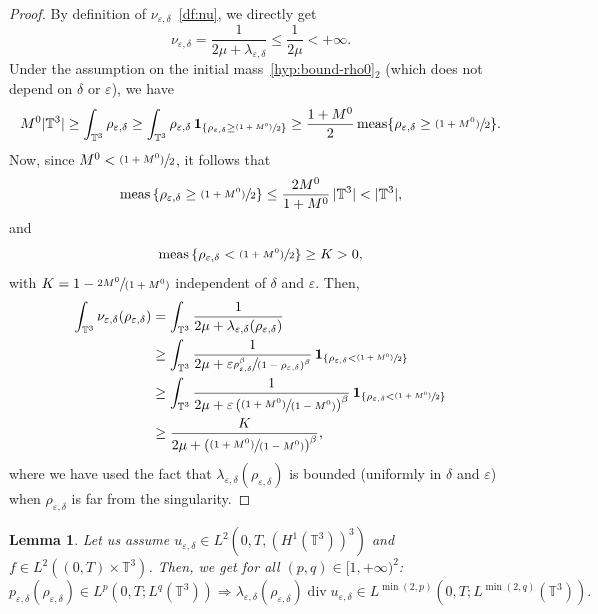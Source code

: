\documentclass[10pt]{amsart}
\newcommand{\<}{\bigl\langle}
\renewcommand{\>}{\bigr\rangle}
\newcommand{\psfrac}[2]{\sfrac{(#1)}{#2}}
\newcommand{\spfrac}[2]{\sfrac{#1}{(#2)}}
\newcommand{\pspfrac}[2]{\sfrac{(#1)}{(#2)}}
\DeclareMathOperator{\meas}{meas}
\newtheorem{lem}[thm]{Lemma}
\theoremstyle{definition}
\theoremstyle{remark}
\newcommand{\TT}{\mathbb{T}^3}
\DeclareMathOperator{\Div}{div}
\let\ep\varepsilon
\begin{document}
\begin{proof} By definition of $\nu_{\ep,\delta}$~\eqref{df:nu}, we directly get
\[
\nu_{\ep,\delta} = \dfrac{1}{2\mu + \lambda_{\ep,\delta}} \leq \dfrac{1}{2\mu} < +\infty.
\]
Under the assumption on the initial mass~\eqref{hyp:bound-rho0}${}_2$ (which does not depend on $\delta$ or $\ep$), we have
\[
M^0 |\TT|
\geq \int_{\TT}{\rho_{\ep,\delta}} \geq \int_{\TT}{\rho_{\ep,\delta} \,\mathbf{1}_{\{\rho_{\ep,\delta} \geq \psfrac{1+M^0}{2}\}} }
\geq \dfrac{1+M^0}{2} \meas\{\rho_{\ep,\delta} \geq \psfrac{1+M^0}{2}\}.
\]
Now, since $ M^0 < \psfrac{1+M^0}{2 }$, it follows that
\begin{equation*}
\meas \left\{ \rho_{\ep,\delta} \geq \psfrac{1+M^0}{2} \right\} \leq \dfrac{2M^0}{1+M^0}\,|\TT| < |\TT|,
\end{equation*}
and
\begin{equation*}
\meas \left\{ \rho_{\ep,\delta} < \psfrac{1+M^0}{2} \right\} \geq K > 0,
\end{equation*}
with $K = 1- \spfrac{2M^0}{1+M^0}$ independent of $\delta$ and $\ep$.
Then,
\begin{align*}
\int_{\TT}{\nu_{\ep,\delta}(\rho_{\ep,\delta})}
& = \int_{\TT}{\dfrac{1}{2\mu + \lambda_{\ep,\delta}(\rho_{\ep,\delta})} }\\
& \geq \int_{\TT}{\dfrac{1}{2\mu + \ep \sfrac{\rho_{\ep,\delta}^\beta}{(1-\rho_{\ep,\delta})^\beta}}\,\mathbf{1}_{\{ \rho_{\ep,\delta} < \psfrac{1+M^0}{2} \}} } \\
& \geq \int_{\TT}{\dfrac{1}{2\mu + \ep \left(\pspfrac{1+M^0}{1-M^0}\right)^\beta }\,\mathbf{1}_{\{ \rho_{\ep,\delta} < \psfrac{1+M^0}{2} \}} }\\
& \geq \dfrac{K}{2\mu + \left(\pspfrac{1+M^0}{1-M^0}\right)^\beta},
\end{align*}
where we have used the fact that $\lambda_{\ep,\delta}(\rho_{\ep,\delta})$ is bounded (uniformly in $\delta$ and $\ep$) when $\rho_{\ep,\delta}$ is far from the singularity.
\end{proof}

\begin{lem}{\label{lambdadivu}} Let us assume $u_{\ep,\delta} \in L^2(0,T,(H^1(\TT))^3)$ and $f \in L^2((0,T) \times \TT)$.
Then, we get for all $(p,q) \in [1,+\infty)^2$:
\[
p_{\varepsilon,\delta} (\rho_{\varepsilon,\delta}) \in L^p (0,T;L^q(\TT))
\Longrightarrow 
\lambda_{\varepsilon, \delta}
(\rho_{\varepsilon,\delta}) \Div u_{\varepsilon,\delta} \in L^{\min{(2,p)}}(0,T;L^{\min(2,q)}(\TT)).
\]
\end{lem}
\end{document}

